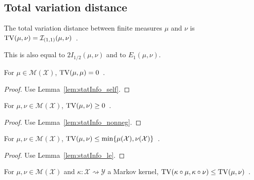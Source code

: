 


\subsection{Total variation distance}

\begin{definition}
  \label{def:TV}
  \leanok
  The total variation distance between finite measures $\mu$ and $\nu$ is $\operatorname{TV}(\mu, \nu) = \mathcal I_{(1,1)}(\mu, \nu)$~.
\end{definition}

This is also equal to $2 I_{1/2}(\mu, \nu)$ and to $E_1(\mu, \nu)$.

\begin{lemma}
  \label{lem:tv_self}
  \leanok
  For $\mu \in \mathcal M(\mathcal X)$, $\operatorname{TV}(\mu, \mu) = 0$~.
\end{lemma}

\begin{proof}\leanok
{}
Use Lemma~\ref{lem:statInfo_self}.
\end{proof}

\begin{lemma}
  \label{lem:tv_nonneg}
  \leanok
  For $\mu, \nu \in \mathcal M(\mathcal X)$, $\operatorname{TV}(\mu, \nu) \ge 0$~.
\end{lemma}

\begin{proof}\leanok
{}
Use Lemma~\ref{lem:statInfo_nonneg}.
\end{proof}


\begin{lemma}
  \label{lem:tv_le}
  \leanok
  For $\mu, \nu \in \mathcal M(\mathcal X)$, $\operatorname{TV}(\mu, \nu) \le \min\{\mu(\mathcal X), \nu(\mathcal X)\}$~.
\end{lemma}

\begin{proof}\leanok
{}
Use Lemma~\ref{lem:statInfo_le}.
\end{proof}


\begin{theorem}
  \label{thm:tv_data_proc}
  \leanok
  For $\mu, \nu \in \mathcal M(\mathcal X)$ and $\kappa : \mathcal X \rightsquigarrow \mathcal Y$ a Markov kernel, $\operatorname{TV}(\kappa \circ \mu, \kappa \circ \nu) \le \operatorname{TV}(\mu, \nu)$~.
\end{theorem}

